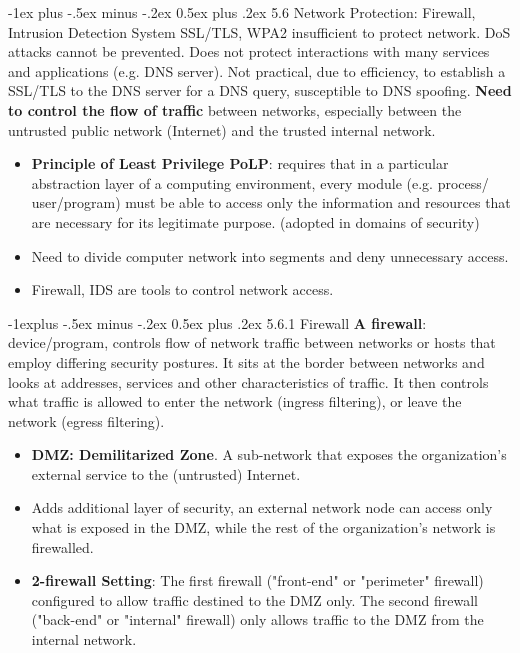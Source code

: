 \documentclass[10pt, landscape]{article}
\makeatletter
\renewcommand{\section}{\@startsection{section}{1}{0mm}%
                                {-1ex plus -.5ex minus -.2ex}%
                                {0.5ex plus .2ex}%
                                {\normalfont\large\bfseries}}
\renewcommand{\subsection}{\@startsection{subsection}{2}{0mm}%
                                {-1explus -.5ex minus -.2ex}%
                                {0.5ex plus .2ex}%
                                {\normalfont\normalsize\bfseries}}
\makeatother
\begin{document}
\begin{multicols*}{3}
\section{5.6 Network Protection: Firewall, Intrusion Detection System}
SSL/TLS, WPA2 insufficient to protect network. DoS attacks cannot be prevented. Does not protect interactions with many services and applications (e.g. DNS server). Not practical, due to efficiency, to establish a SSL/TLS to the DNS 
server for a DNS query, susceptible to DNS spoofing. \textbf{Need to control the flow of traffic} between networks, especially between the untrusted public network (Internet) and the trusted internal network.
\begin{itemize}
\item \textbf{Principle of Least Privilege PoLP}: requires that in a particular abstraction layer of a computing 
environment, every module (e.g. process/ user/program) must be able to access only the information and resources that are necessary for its legitimate purpose. (adopted in domains of security)
\item Need to divide computer network into segments and deny unnecessary access. 
\item Firewall, IDS are tools to control network access.
\end{itemize}

\subsection{5.6.1 Firewall}
\textbf{A firewall}: device/program, controls flow of network traffic between networks or 
hosts that employ differing security postures. It sits at the border between networks and 
looks at addresses, services and other characteristics of traffic. It then controls what traffic is 
allowed to enter the network (ingress filtering), or leave the network (egress filtering).
\begin{itemize}
\item \textbf{ DMZ: Demilitarized Zone}. A sub-network that exposes the organization’s external 
service to the (untrusted) Internet.
\item Adds additional layer of security, an external network node can access only what is exposed in the DMZ, 
while the rest of the organization's network is firewalled.
\item \textbf{2-firewall Setting}: The first firewall ("front-end" or "perimeter" firewall) configured to allow traffic 
destined to the DMZ only. The second firewall ("back-end" or "internal" firewall) only allows traffic to the DMZ from the internal network.
\end{itemize}


\end{multicols*}
\end{document}
